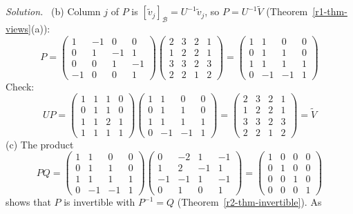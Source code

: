 \documentclass[12pt]{article}
\theoremstyle{definition}
\newenvironment{solution}{\par\noindent\textit{Solution.}\ }{\par\smallskip}
\begin{document}
\begin{solution}
(b) Column \(j\) of \(P\) is \([\tilde v_j]_{\mathcal B}=U^{-1}\tilde v_j\), so \(P=U^{-1}\tilde V\)
(Theorem~\ref{r1-thm-views}(a)):
\[
P=\begin{pmatrix}1&-1&0&0\\0&1&-1&1\\0&0&1&-1\\-1&0&0&1\end{pmatrix}
\begin{pmatrix}2&3&2&1\\1&2&2&1\\3&3&2&3\\2&2&1&2\end{pmatrix}
=\begin{pmatrix}1&1&0&0\\0&1&1&0\\1&1&1&1\\0&-1&-1&1\end{pmatrix}
\]
Check:
\[
UP=\begin{pmatrix}1&1&1&0\\0&1&1&0\\1&1&2&1\\1&1&1&1\end{pmatrix}
\begin{pmatrix}1&1&0&0\\0&1&1&0\\1&1&1&1\\0&-1&-1&1\end{pmatrix}
=\begin{pmatrix}2&3&2&1\\1&2&2&1\\3&3&2&3\\2&2&1&2\end{pmatrix}=\tilde V
\]
(c) The product
\[
PQ=\begin{pmatrix}1&1&0&0\\0&1&1&0\\1&1&1&1\\0&-1&-1&1\end{pmatrix}
\begin{pmatrix}0&-2&1&-1\\1&2&-1&1\\-1&-1&1&-1\\0&1&0&1\end{pmatrix}
=\begin{pmatrix}1&0&0&0\\0&1&0&0\\0&0&1&0\\0&0&0&1\end{pmatrix}
\]
shows that \(P\) is invertible with \(P^{-1}=Q\) (Theorem~\ref{r2-thm-invertible}). As

\end{solution}
\end{document}

